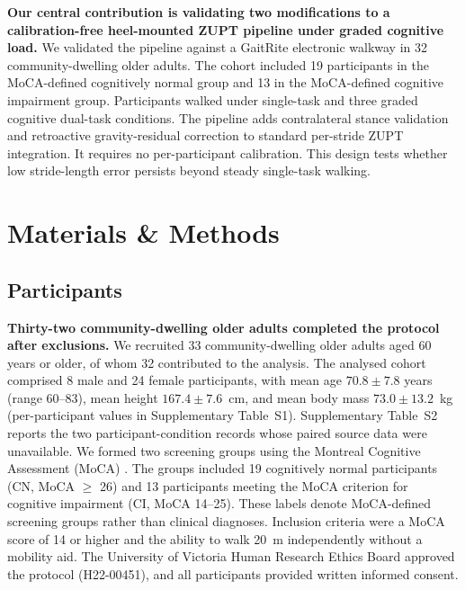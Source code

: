 \documentclass[fleqn,10pt,lineno]{wlpeerj}
\begin{document}
\textbf{Our central contribution is validating two modifications to a calibration-free heel-mounted ZUPT pipeline under graded cognitive load.} We validated the pipeline against a GaitRite electronic walkway in 32 community-dwelling older adults. The cohort included 19 participants in the MoCA-defined cognitively normal group and 13 in the MoCA-defined cognitive impairment group. Participants walked under single-task and three graded cognitive dual-task conditions. The pipeline adds contralateral stance validation and retroactive gravity-residual correction to standard per-stride ZUPT integration. It requires no per-participant calibration. This design tests whether low stride-length error persists beyond steady single-task walking.


\clearpage
\section{Materials \& Methods}

\subsection{Participants}

\textbf{Thirty-two community-dwelling older adults completed the protocol after exclusions.}
We recruited 33 community-dwelling older adults aged 60 years or older, of whom 32 contributed to the analysis. The analysed cohort comprised 8 male and 24 female participants, with mean age $70.8 \pm 7.8$ years (range 60--83), mean height $167.4 \pm 7.6$~cm, and mean body mass $73.0 \pm 13.2$~kg (per-participant values in Supplementary Table~S1). Supplementary Table~S2 reports the two participant-condition records whose paired source data were unavailable. We formed two screening groups using the Montreal Cognitive Assessment (MoCA) \citep{Nasreddine2005}. The groups included 19 cognitively normal participants (CN, MoCA $\geq$ 26) and 13 participants meeting the MoCA criterion for cognitive impairment (CI, MoCA 14--25). These labels denote MoCA-defined screening groups rather than clinical diagnoses. Inclusion criteria were a MoCA score of 14 or higher and the ability to walk 20~m independently without a mobility aid. The University of Victoria Human Research Ethics Board approved the protocol (H22-00451), and all participants provided written informed consent.
\end{document}
